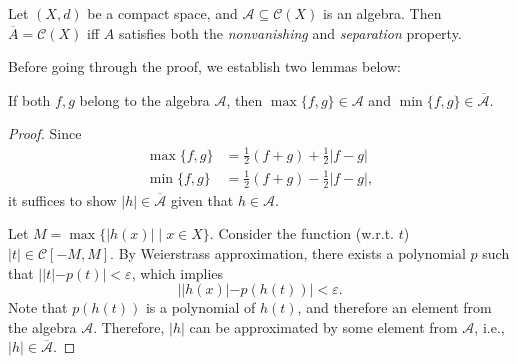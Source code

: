 \begin{theorem}
Let $(X,d)$ be a compact space, and $\mathcal{A}\subseteq\mathcal{C}(X)$ is an algebra.
Then $\overline{A}= \mathcal{C}(X)$ iff $A$ satisfies both the \emph{nonvanishing} and \emph{separation} property.
\end{theorem}
Before going through the proof, we establish two lemmas below:
\begin{proposition}\label{pro:4:12}
If both $f,g$ belong to the algebra $\mathcal{A}$, then
$\max\{f,g\}\in\mathcal{A}$ and $\min\{f,g\}\in\overline{\mathcal{A}}$.
\end{proposition}
\begin{proof}
Since
\begin{align*}
\max\{f,g\}&=\frac{1}{2}(f+g)+\frac{1}{2}|f-g|\\
\min\{f,g\}&=\frac{1}{2}(f+g)-\frac{1}{2}|f-g|,
\end{align*}
it suffices to show $|h|\in\overline{\mathcal{A}}$ given that $h\in\mathcal{A}$. 

Let $M=\max\{|h(x)|\mid x\in X\}$. Consider the function (w.r.t. $t$) $|t|\in\mathcal{C}[-M,M]$. By Weierstrass approximation, there exists a polynomial $p$ such that $||t| - p(t)|<\varepsilon$, which implies 
\[
||h(x)| - p(h(t))|<\varepsilon.
\]
Note that $p(h(t))$ is a polynomial of $h(t)$, and therefore an element from the algebra $\mathcal{A}$. 
Therefore, $|h|$ can be approximated by some element from $\mathcal{A}$, i.e., $|h|\in\overline{\mathcal{A}}$.
\end{proof}


